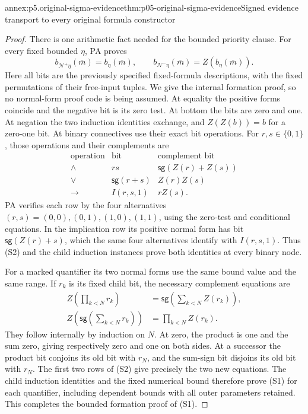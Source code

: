 \begin{annexitem}{annex:p5.original-sigma-evidence}{thm:p05-original-sigma-evidence}{Signed evidence transport to every original formula constructor}
\begin{proof}
There is one arithmetic fact needed for the bounded priority clause.
For every fixed bounded \(\eta\), PA proves
\[
 b_{\mathcal N^+\eta}(\bar m)=b_\eta(\bar m),\qquad
 b_{\mathcal N^-\eta}(\bar m)=Z(b_\eta(\bar m)).
\tag{S1}
\]
Here all bits are the previously specified fixed-formula descriptions,
with the fixed permutations of their free-input tuples. We give the
internal formation proof, so no normal-form proof code is being assumed.
At equality the positive forms coincide and the negative bit is its
zero test. At bottom the bits are zero and one. At negation the two
induction identities exchange, and \(Z(Z(b))=b\) for a zero-one
bit. At binary connectives use their exact bit operations. For
\(r,s\in\{0,1\}\), those operations and their complements are
\[
\begin{array}{c|c|c}
 \text{operation}&\text{bit}&\text{complement bit}\\\hline
 \land&rs&\mathsf{sg}(Z(r)+Z(s))\\
 \lor&\mathsf{sg}(r+s)&Z(r)Z(s)\\
 \to&I(r,s,1)&rZ(s).
\end{array}
\tag{S2}
\]
PA verifies each row by the four alternatives
\((r,s)=(0,0),(0,1),(1,0),(1,1)\), using the zero-test and
conditional equations. In the implication row its positive normal
form has bit \(\mathsf{sg}(Z(r)+s)\), which the same four
alternatives identify with \(I(r,s,1)\). Thus (S2) and the child
induction instances prove both identities at every binary node.

For a marked quantifier its two normal forms use the same bound
value and the same range. If \(r_k\) is its fixed child bit,
the necessary complement equations are
\[
\begin{aligned}
 Z\left(\prod_{k<N}r_k\right)
       &=\mathsf{sg}\left(\sum_{k<N}Z(r_k)\right),\\
 Z\left(\mathsf{sg}\left(\sum_{k<N}r_k\right)\right)
       &=\prod_{k<N}Z(r_k).
\end{aligned}
\tag{S3}
\]
They follow internally by induction on \(N\). At zero, the
product is one and the sum zero, giving respectively zero and
one on both sides. At a successor the product bit conjoins its
old bit with \(r_N\), and the sum-sign bit disjoins its old
bit with \(r_N\). The first two rows of (S2) give precisely
the two new equations. The child induction identities and the
fixed numerical bound therefore prove (S1) for each quantifier,
including dependent bounds with all outer parameters retained.
This completes the bounded formation proof of (S1).


\end{proof}
\end{annexitem}
